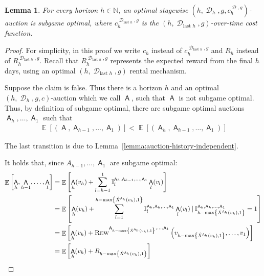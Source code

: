 \documentclass[11pt,letterpaper]{article}
\newcommand{\set}[1]{\left\{#1\right\}}
\newcommand{\sqbr}[1]{\left[ #1 \right]}
\newcommand{\brackets}[1]{\left( #1 \right)}
\newcommand{\nat}{\mathbb{N}}
\DeclareMathOperator*{\E}{\bb{E}}
\DeclareMathOperator{\history}{\mathcal{H}}
\newcommand{\given}{\medspace | \medspace}
\newcommand{\bb}[1]{\mathbb{#1}}
\DeclareMathOperator{\A}{\auc{A}}
\DeclareMathOperator{\D}{\mathcal{D}}
\DeclareMathOperator{\M}{\mech{M}}
\newcommand{\g}{g}
\newcommand{\sumof}[3]{\sum_{{#1}={#2}}^{#3}\limits}
\theoremstyle{plain}
\newtheorem{lemma}[theorem]{Lemma}
\newcommand{\auc}[1]{\mathsf{#1}}
\newcommand{\mech}[1]{\mathsf{#1}}
\begin{document}

\begin{lemma}
\label{lemma:over-time-cost-subgame-optimal}
For every horizon $h\in\nat$, an optimal stagewise $\brackets{h,\D_h,\g,c_{h}^{\D,\g}}$-auction is subgame optimal, where $c_{h}^{\boldsymbol{\D}_{\text{last }h},\g}$ is the $(h,\boldsymbol{\D}_{\text{last }h},\g)$-over-time cost function.
\end{lemma}
\begin{proof}
    For simplicity, in this proof we write $c_h$ instead of $c_{h}^{\boldsymbol{\D}_{\text{last }h},\g}$ and $R_h$ instead of $R_h^{\boldsymbol{\D}_{\text{last }h},\g}$. Recall that $R_h^{\boldsymbol{\D}_{\text{last }h},\g}$ represents the expected reward from the final $h$ days, using an optimal $(h,\D_{\text{last }h},\g)$ rental mechanism.
    
    Suppose the claim is false. Thus there is a horizon $h$ and an optimal $\brackets{h,\D_h,\g,c}$-auction which we call $\A$, such that $\A$ is not subgame optimal. Thus, by definition of subgame optimal, there are subgame optimal auctions $\A_h,\dots,\A_1$ such that
    \begin{align*}
        \E\sqbr{\brackets{\A,\A_{h-1},\dots,\A_1}}<\E\sqbr{\brackets{\A_h,\A_{h-1},\dots,\A_1}}
    \end{align*}

    The last transition is due to Lemma~\ref{lemma:auction-history-independent}.

    
    It holds that, since $A_{h-1},\dots,\A_1$ are subgame optimal:
    \begin{align*}
        \E\sqbr{\A_h,\A_{h-1},\dots,\A_1}&=\E\sqbr{\A_h(v_h)+\sumof{l}{h-1}{1}\ind[\A_h,\A_{h-1},\dots,\A_1]{l}\A_l(v_l)}\\
        &=\E\sqbr{\A_h(v_h)+\sumof{l}{1}{h-\max\set{\xhat[\A_h]{v_h},1}}\ind[\A_h,\A_{h},\dots,\A_1]{l}\A_l(v_l)\given\ind[\A_h,\A_{h},\dots,\A_1]{h-\max\set{\xhat[\A_h]{v_h},1}}=1}\\
        &=\E\sqbr{\A_h(v_h)+\trew[\A_{h-\max\set{\xhat[\A_h]{v_h},1}},\dots,\A_1]{v_{h-\max\set{\xhat[\A_h]{v_h},1}},\dots,v_1}}\\
        &=\E\sqbr{\A_h(v_h)+R_{h-\max\set{\xhat[\A_h]{v_h},1}}}
    \end{align*}


\end{proof}
\end{document}
